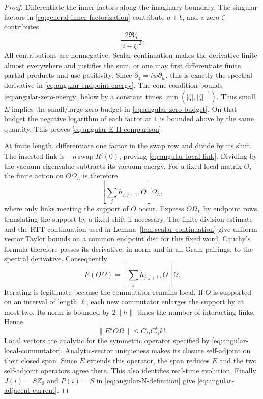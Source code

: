 \begin{proof}
Differentiate the inner factors along the imaginary boundary.  The
singular factors in \eqref{eq:general-inner-factorization} contribute
$a+b$, and a zero $\zeta$ contributes
\begin{equation}\label{eq:angular-zero-energy}
 \frac{2\Re\zeta}{|i-\zeta|^2}.
\end{equation}
All contributions are nonnegative.  Scalar continuation makes the
derivative finite almost everywhere and justifies the sum, or one may
first differentiate finite partial products and use positivity.
Since $\partial_z=iw\partial_w$, this is exactly the spectral
derivative in \eqref{eq:angular-endpoint-energy}.  The cone condition
bounds \eqref{eq:angular-zero-energy} below by a constant times
$\min(|\zeta|,|\zeta|^{-1})$.  Thus small $E$ implies the small/large
zero budget in \eqref{eq:angular-zero-budget}.  On that budget the
negative logarithm of each factor at $1$ is bounded above by the same
quantity.  This proves \eqref{eq:angular-E-H-comparison}.

At finite length, differentiate one factor in the swap row and divide
by its shift.  The inserted link is
$-\eta\operatorname{swap}R'(0)$, proving
\eqref{eq:angular-local-link}.  Dividing by the vacuum eigenvalue
subtracts its vacuum energy.  For a fixed local matrix $O$, the finite
action on $O\Omega_L$ is therefore
\[
 \left[\sum_jh_{j,j+1},O\right]\Omega_L,
\]
where only links meeting the support of $O$ occur.  Express
$O\Omega_L$ by endpoint rows, translating the support by a fixed shift
if necessary.  The finite division estimate and the RTT continuation
used in Lemma~\ref{lem:scalar-continuation} give uniform vector Taylor
bounds on a common endpoint disc for this fixed word.  Cauchy's formula
therefore passes its derivative, in norm and in all Gram pairings, to
the spectral derivative.  Consequently
\begin{equation}\label{eq:angular-local-commutator}
 E(O\Omega)=\left[\sum_jh_{j,j+1},O\right]\Omega.
\end{equation}
Iterating is legitimate because the commutator remains local.
If $O$ is supported on an interval of length $\ell$, each new
commutator enlarges the support by at most two.  Its norm is bounded
by $2\|h\|$ times the number of interacting links.  Hence
\[
 \|E^kO\Omega\|\le C_O C_O^k k!.
\]
Local vectors are analytic for the symmetric operator specified by
\eqref{eq:angular-local-commutator}.  Analytic-vector uniqueness makes
its closure self-adjoint on their closed span.  Since $E$ extends this
operator, the span reduces $E$ and the two self-adjoint operators agree
there.  This also identifies real-time evolution.  Finally
$J(i)=SZ_0$ and $P(i)=S$ in
\eqref{eq:angular-N-definition} give
\eqref{eq:angular-adjacent-current}.
\end{proof}

